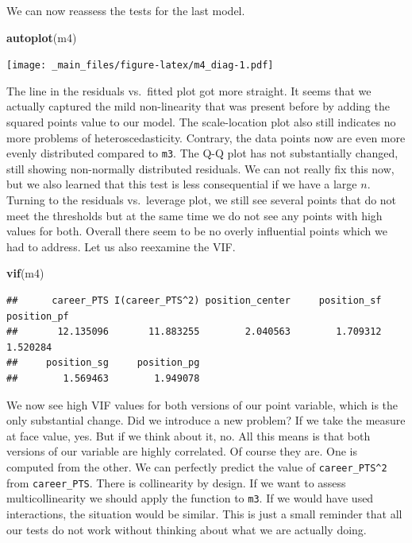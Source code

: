 \documentclass[
]{book}
\newenvironment{Shaded}{\begin{snugshade}}{\end{snugshade}}
\newcommand{\FunctionTok}[1]{\textcolor[rgb]{0.13,0.29,0.53}{\textbf{#1}}}
\newcommand{\NormalTok}[1]{#1}
\begin{document}
We can now reassess the tests for the last model.

\begin{Shaded}
\begin{Highlighting}[]
\FunctionTok{autoplot}\NormalTok{(m4)}
\end{Highlighting}
\end{Shaded}

\texttt{[image: \_main\_files/figure-latex/m4\_diag-1.pdf]}

The line in the residuals vs.~fitted plot got more straight. It seems that we
actually captured the mild non-linearity that was present before by adding the
squared points value to our model. The scale-location plot also still indicates
no more problems of heteroscedasticity. Contrary, the data points now are even
more evenly distributed compared to \texttt{m3}. The Q-Q plot has not substantially changed,
still showing non-normally distributed residuals. We can not really fix this
now, but we also learned that this test is less consequential if we have a
large \(n\). Turning to the residuals vs.~leverage plot, we still see several points
that do not meet the thresholds but at the same time we do not see any points
with high values for both. Overall there seem to be no overly influential points
which we had to address. Let us also reexamine the VIF.

\begin{Shaded}
\begin{Highlighting}[]
\FunctionTok{vif}\NormalTok{(m4)}
\end{Highlighting}
\end{Shaded}

\begin{verbatim}
##      career_PTS I(career_PTS^2) position_center     position_sf     position_pf 
##       12.135096       11.883255        2.040563        1.709312        1.520284 
##     position_sg     position_pg 
##        1.569463        1.949078
\end{verbatim}

We now see high VIF values for both versions of our point variable, which is the
only substantial change. Did we introduce a
new problem? If we take the measure at face value, yes. But if we think about
it, no. All this means is that both versions of our variable are highly
correlated. Of course they are. One is computed from the other. We can
perfectly predict the value of \texttt{career\_PTS\^{}2} from \texttt{career\_PTS}. There is
collinearity by design. If we want to assess multicollinearity we should apply
the function to \texttt{m3}. If we would have used interactions, the situation would be
similar. This is just a small reminder that all our tests do not work without
thinking about what we are actually doing.
\end{document}
